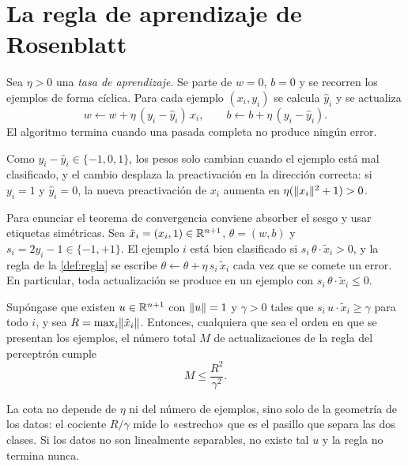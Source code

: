 \section{La regla de aprendizaje de Rosenblatt}

\begin{definicion}\label{def:regla}
Sea $\eta>0$ una \emph{tasa de aprendizaje}. Se parte de $w=0$, $b=0$ y se recorren los ejemplos de forma cíclica. Para cada ejemplo $(x_i,y_i)$ se calcula $\hat y_i$ y se actualiza
\[
w\leftarrow w+\eta\,(y_i-\hat y_i)\,x_i,\qquad b\leftarrow b+\eta\,(y_i-\hat y_i).
\]
El algoritmo termina cuando una pasada completa no produce ningún error.
\end{definicion}

Como $y_i-\hat y_i\in\{-1,0,1\}$, los pesos solo cambian cuando el ejemplo está mal clasificado, y el cambio desplaza la preactivación en la dirección correcta: si $y_i=1$ y $\hat y_i=0$, la nueva preactivación de $x_i$ aumenta en $\eta(\lVert x_i\rVert^{2}+1)>0$.

\addtocounter{definicion}{1}%

Para enunciar el teorema de convergencia conviene absorber el sesgo y usar etiquetas simétricas. Sea $\tilde x_i=(x_i,1)\in\mathbb{R}^{n+1}$, $\theta=(w,b)$ y $s_i=2y_i-1\in\{-1,+1\}$. El ejemplo $i$ está bien clasificado si $s_i\,\theta\cdot\tilde x_i>0$, y la regla de la \cref{def:regla} se escribe $\theta\leftarrow\theta+\eta\,s_i\,\tilde x_i$ cada vez que se comete un error. En particular, toda actualización se produce en un ejemplo con $s_i\,\theta\cdot\tilde x_i\le 0$.

\begin{teorema}\label{teo:novikoff}
Supóngase que existen $u\in\mathbb{R}^{n+1}$ con $\lVert u\rVert=1$ y $\gamma>0$ tales que $s_i\,u\cdot\tilde x_i\ge\gamma$ para todo $i$, y sea $R=\max_i\lVert\tilde x_i\rVert$. Entonces, cualquiera que sea el orden en que se presentan los ejemplos, el número total $M$ de actualizaciones de la regla del perceptrón cumple
\[
M\le\frac{R^{2}}{\gamma^{2}}.
\]
\end{teorema}

\begin{observacion}
La cota no depende de $\eta$ ni del número de ejemplos, sino solo de la geometría de los datos: el cociente $R/\gamma$ mide lo «estrecho» que es el pasillo que separa las dos clases. Si los datos no son linealmente separables, no existe tal $u$ y la regla no termina nunca.
\end{observacion}

